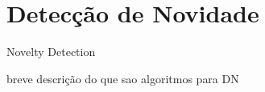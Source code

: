 




\section{Detecção de Novidade}

Novelty Detection

breve descrição do que sao algoritmos para DN


\cite{Costa2019thesis}

